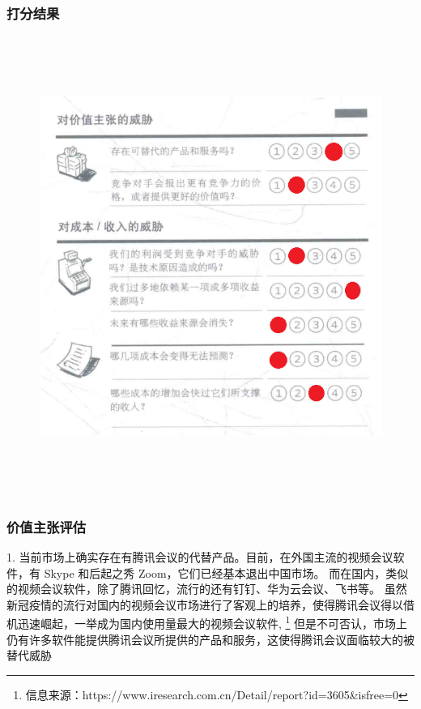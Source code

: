\documentclass[a4paper,12pt]{article}
\begin{document}
    \subsubsection{打分结果}
    \begin{figure}[htbp]
        \centering
        \includegraphics[width=15cm,height=15cm]{png/评估威胁}
    \end{figure}
    \clearpage %

    \subsubsection{价值主张评估}


    1.
    当前市场上确实存在有腾讯会议的代替产品。目前，在外国主流的视频会议软件，有 Skype 和后起之秀 Zoom，它们已经基本退出中国市场。
    而在国内，类似的视频会议软件，除了腾讯回忆，流行的还有钉钉、华为云会议、飞书等。
    虽然新冠疫情的流行对国内的视频会议市场进行了客观上的培养，使得腾讯会议得以借机迅速崛起，一举成为国内使用量最大的视频会议软件,
    \footnote{信息来源：https://www.iresearch.com.cn/Detail/report?id=3605\&isfree=0}
    但是不可否认，市场上仍有许多软件能提供腾讯会议所提供的产品和服务，这使得腾讯会议面临较大的被替代威胁
\end{document}
